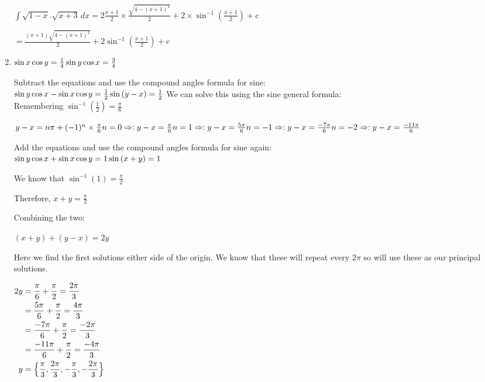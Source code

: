 \documentclass[../main.tex]{subfiles}
\begin{document}
\begin{enumerate}[itemsep=1cm]
    \(\int \sqrt{1-x}.\sqrt{x+3}\,dx=2\frac{x+1}{2}\times \frac{\sqrt{4-(x+1)^2}}{2}+2\times \sin^{-1}{(\frac{x+1}{2})}+c\)

    \(=\frac{(x+1)\sqrt{4-(x+1)^2}}{2}+2\sin^{-1}{(\frac{x+1}{2})}+c\)
    
    \item 
    $
    \sin{x}\cos{y}=\frac{1}{4}\\
    \sin{y}\cos{x}=\frac{3}{4}
    $

    Subtract the equations and use the compound angles formula for sine:\\
    $
    \sin{y}\cos{x}-\sin{x}\cos{y}=\frac{1}{2}\\
    \sin{(y-x)}=\frac{1}{2}\\
    $
    We can solve this using the sine general formula:\\
    Remembering \(\sin^{-1}{(\frac{1}{2})}=\frac{\pi}{6}\)

    \(y-x=n\pi + (-1)^n\times \frac{\pi}{6}\\
    n=0 \Rightarrow : y-x = \frac{\pi}{6}\\
    n=1 \Rightarrow : y-x = \frac{5\pi}{6}\\
    n=-1 \Rightarrow : y-x = \frac{-7\pi}{6}\\
    n=-2 \Rightarrow : y-x = \frac{-11\pi}{6}\\
    \)
    
    Add the equations and use the compound angles formula for sine again:\\
    \(\sin{y}\cos{x}+\sin{x}\cos{y}=1\\
    \sin{(x+y)}=1\)

    We know that \(\sin^{-1}{(1)}=\frac{\pi}{2}\)

    Therefore, \(x+y=\frac{\pi}{2}\)

    Combining the two:

    \((x+y)+(y-x)=2y\)

    Here we find the first solutions either side of the origin. We know that these will repeat every \(2\pi\) so will use these as our principal solutions.

    $
    \!
    \begin{aligned}[t]
        2y
        &=\frac{\pi}{6}+\frac{\pi}{2}=\frac{2\pi}{3}\\
        &=\frac{5\pi}{6}+\frac{\pi}{2}=\frac{4\pi}{3}\\
        &=\frac{-7\pi}{6}+\frac{\pi}{2}=\frac{-2\pi}{3}\\
        &=\frac{-11\pi}{6}+\frac{\pi}{2}=\frac{-4\pi}{3}\\
        y &= \Bigl\{\frac{\pi}{3},\frac{2\pi}{3},-\frac{\pi}{3},-\frac{2\pi}{3}\Bigr\}
    \end{aligned}
    $


\end{enumerate}
\end{document}
